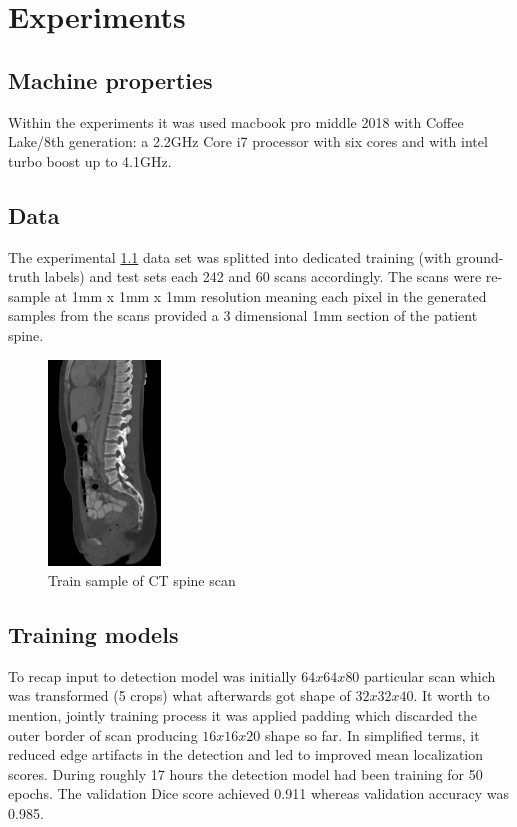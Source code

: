 \chapter{Experiments}
\label{ch:experiments}


\section{Machine properties}
Within the experiments it was used macbook pro middle 2018 with Coffee Lake/8th generation: a 2.2GHz Core i7 processor with six cores and with intel turbo boost up to 4.1GHz.

\section{Data}
The experimental \ref{fig:ct_spine} data set was splitted into dedicated training (with ground-truth labels) and test sets each 242 and 60 scans accordingly. The scans were re-sample  at 1mm x 1mm x 1mm resolution meaning each pixel in the generated samples from the scans provided a 3 dimensional 1mm section of the patient spine.
\begin{figure}[h]
    \centering \includegraphics[width=3cm]{images/ct-spine.jpg}
    \caption {Train sample of CT spine scan}
    \label{fig:ct_spine}
\end{figure}


\section{Training models}
To recap input to detection model was initially $64x64x80$ particular scan which was transformed (5 crops) what afterwards got shape of $32x32x40$. It worth to mention, jointly training process it was applied padding which discarded the outer border of scan producing $16x16x20$ shape so far. In simplified terms, it reduced edge artifacts in the detection and led to improved mean localization scores. During roughly 17 hours the detection model had been training for 50 epochs. The validation Dice score achieved 0.911 whereas validation accuracy was 0.985. 

